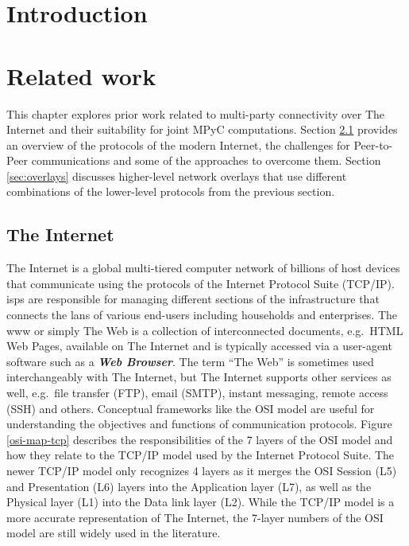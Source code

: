 \tableofcontents

\printnoidxglossary[type=\acronymtype,title=List of Abbreviations]
\listoffigures

\mainmatter

\hypertarget{introduction}{%
\chapter{Introduction}\label{introduction}}

\hypertarget{related-work}{%
\chapter{Related work}\label{related-work}}

This chapter explores prior work related to multi-party connectivity
over The Internet and their suitability for joint MPyC computations.
Section \ref{sec:internet} provides an overview of the protocols of the
modern Internet, the challenges for Peer-to-Peer communications and some
of the approaches to overcome them. Section \ref{sec:overlays} discusses
higher-level network overlays that use different combinations of the
lower-level protocols from the previous section.

\hypertarget{sec:internet}{%
\section{The Internet}\label{sec:internet}}

The Internet is a global multi-tiered computer network of billions of
host devices that communicate using the protocols of the Internet
Protocol Suite (TCP/IP). \glspl{isp} are responsible for managing
different sections of the infrastructure that connects the \glspl{lan}
of various end-users including households and enterprises. The \gls{www}
or simply The Web is a collection of interconnected documents, e.g.~HTML
Web Pages, available on The Internet and is typically accessed via a
user-agent software such as a \textbf{\emph{Web Browser}}. The term
``The Web'' is sometimes used interchangeably with The Internet, but The
Internet supports other services as well, e.g.~file transfer (FTP),
email (SMTP), instant messaging, remote access (SSH) and others.
Conceptual frameworks like the OSI model are useful for understanding
the objectives and functions of communication protocols. Figure
\ref{osi-map-tcp} describes the responsibilities of the 7 layers of the
OSI model and how they relate to the TCP/IP model used by the Internet
Protocol Suite. The newer TCP/IP model only recognizes 4 layers as it
merges the OSI Session (L5) and Presentation (L6) layers into the
Application layer (L7), as well as the Physical layer (L1) into the Data
link layer (L2). While the TCP/IP model is a more accurate
representation of The Internet, the 7-layer numbers of the OSI model are
still widely used in the literature.

